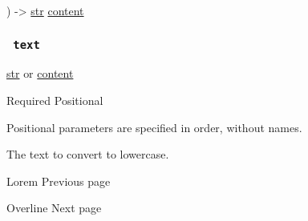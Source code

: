 ) -\textgreater{} \href{/docs/reference/foundations/str/}{str}
\href{/docs/reference/foundations/content/}{content}

\subsubsection{\texorpdfstring{\texttt{\ text\ }}{ text }}\label{parameters-text}

\href{/docs/reference/foundations/str/}{str} {or}
\href{/docs/reference/foundations/content/}{content}

{Required} {{ Positional }}

\label{parameters-text-positional-tooltip}
Positional parameters are specified in order, without names.

The text to convert to lowercase.

\href{/docs/reference/text/lorem/}{\pandocbounded{}}

{ Lorem } { Previous page }

\href{/docs/reference/text/overline/}{\pandocbounded{}}

{ Overline } { Next page }
